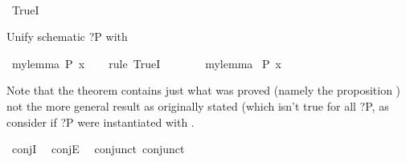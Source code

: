 \begin{isabellebody}
\ \ \isamarkupfalse%
%
\endisatagproof
{\isafoldproof}%
%
\isadelimproof
%
\endisadelimproof
%
\begin{isamarkuptext}%
%
\end{isamarkuptext}\isamarkuptrue%
\isamarkupfalse%
\ TrueI%
\begin{isamarkuptext}%
Unify schematic ?P with %
\end{isamarkuptext}\isamarkuptrue%
\isamarkupfalse%
\ mylemma{\isacharcolon}{\kern0pt}\ {\isachardoublequoteopen}{\isacharquery}{\kern0pt}P\ x{\isachardoublequoteclose}\ \isanewline
%
\isadelimproof
\ \ %
\endisadelimproof
%
\isatagproof
{}\isamarkupfalse%
{\isacharparenleft}{\kern0pt}rule\ TrueI{\isacharparenright}{\kern0pt}\ \isanewline
\ \ \isanewline
\ \ \isamarkupfalse%
%
\endisatagproof
{\isafoldproof}%
%
\isadelimproof
\isanewline
%
\endisadelimproof
\isanewline
{}\isamarkupfalse%
\ mylemma\isanewline
\isanewline
{}\isamarkupfalse%
\ {\isachardoublequoteopen}P\ x{\isachardoublequoteclose}\isanewline
%
\isadelimproof
\ \ %
\endisadelimproof
%
\isatagproof
{}\isamarkupfalse%
%
\endisatagproof
{\isafoldproof}%
%
\isadelimproof
%
\endisadelimproof
%
\begin{isamarkuptext}%
Note that the theorem  contains just what was proved (namely the proposition
  ) not the more general result as originally stated (which isn't true for all ?P,
  as consider if ?P were instantiated with .%
\end{isamarkuptext}\isamarkuptrue%
%
\isadelimdocument
%
\endisadelimdocument
%
\isatagdocument
%
\isamarkuptrue%
%
\isamarkuptrue%
%
\endisatagdocument
{\isafolddocument}%
%
\isadelimdocument
%
\endisadelimdocument
%
\begin{isamarkuptext}%
\isa{{\isasymand}}%
\end{isamarkuptext}\isamarkuptrue%
\isamarkupfalse%
\ conjI\ \isanewline
{}\isamarkupfalse%
\ conjE\ \isanewline
{}\isamarkupfalse%
\ conjunct{}\ conjunct{}%

\end{isabellebody}

